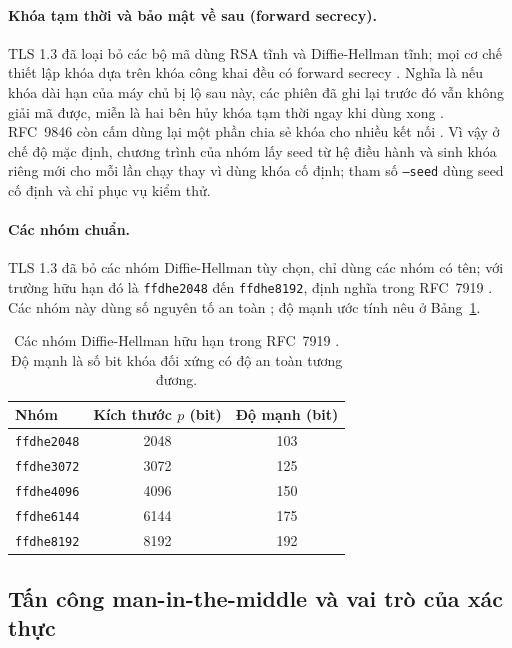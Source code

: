 \paragraph{Khóa tạm thời và bảo mật về sau (forward secrecy).}
TLS 1.3 đã loại bỏ các bộ mã dùng RSA tĩnh và Diffie-Hellman tĩnh; mọi cơ chế
thiết lập khóa dựa trên khóa công khai đều có forward secrecy \cite{rfc9846}.
Nghĩa là nếu khóa dài hạn của máy chủ bị lộ sau này, các phiên đã ghi lại trước
đó vẫn không giải mã được, miễn là hai bên hủy khóa tạm thời ngay khi dùng xong
\cite{rfc7919}. RFC~9846 còn cấm dùng lại một phần chia sẻ khóa cho nhiều kết nối
\cite{rfc9846}. Vì vậy ở chế độ mặc định, chương trình của nhóm lấy seed từ hệ điều hành và sinh
khóa riêng mới cho mỗi lần chạy thay vì dùng khóa cố định; tham số \texttt{--seed}
dùng seed cố định và chỉ phục vụ kiểm thử.

\paragraph{Các nhóm chuẩn.}
TLS 1.3 đã bỏ các nhóm Diffie-Hellman tùy chọn, chỉ dùng các nhóm có tên; với
trường hữu hạn đó là \texttt{ffdhe2048} đến \texttt{ffdhe8192}, định nghĩa trong
RFC~7919 \cite{rfc9846,rfc7919}. Các nhóm này dùng số nguyên tố an toàn
\cite{rfc7919}; độ mạnh ước tính nêu ở Bảng~\ref{tab:ffdhe}.

\begin{table}[!htbp]
\centering
\begin{tabular}{@{}lcc@{}}
\toprule
Nhóm & Kích thước $p$ (bit) & Độ mạnh (bit) \\
\midrule
\texttt{ffdhe2048} & 2048 & 103 \\
\texttt{ffdhe3072} & 3072 & 125 \\
\texttt{ffdhe4096} & 4096 & 150 \\
\texttt{ffdhe6144} & 6144 & 175 \\
\texttt{ffdhe8192} & 8192 & 192 \\
\bottomrule
\end{tabular}
\caption{Các nhóm Diffie-Hellman hữu hạn trong RFC~7919 \cite{rfc7919}. Độ mạnh là số bit khóa đối xứng có độ an toàn tương đương.}
\label{tab:ffdhe}
\end{table}

\subsection{Tấn công man-in-the-middle và vai trò của xác thực}

